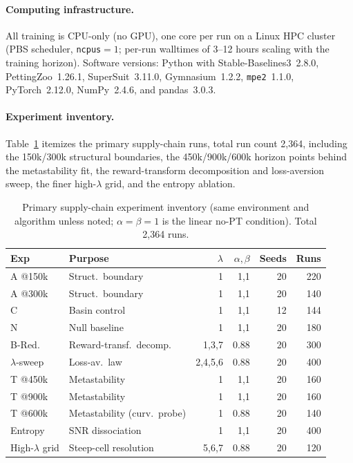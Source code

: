 \documentclass[letterpaper]{article} %
\theoremstyle{plain}
\begin{document}
\paragraph{Computing infrastructure.}
All training is CPU-only (no GPU), one core per run on a Linux HPC cluster (PBS scheduler,
\texttt{ncpus}${=}1$; per-run walltimes of 3--12 hours scaling with the training horizon).
Software versions: Python with Stable-Baselines3~2.8.0, PettingZoo~1.26.1, SuperSuit~3.11.0,
Gymnasium~1.2.2, \texttt{mpe2}~1.1.0, PyTorch~2.12.0, NumPy~2.4.6, and pandas~3.0.3.

\paragraph{Experiment inventory.}
Table~\ref{tab:experiments} itemizes the primary supply-chain runs, total run count 2{,}364,
including the 150k/300k structural boundaries, the 450k/900k/600k horizon points behind the
metastability fit, the reward-transform decomposition and loss-aversion sweep, the finer
high-$\lambda$ grid, and the entropy ablation.

\begin{table}[t]
\centering
\caption{Primary supply-chain experiment inventory (same environment and algorithm unless noted;
$\alpha{=}\beta{=}1$ is the linear no-PT condition). Total 2{,}364 runs.}
\label{tab:experiments}
\small
\setlength{\tabcolsep}{3pt}
\begin{tabular}{llrrrr}
\toprule
Exp & Purpose & $\lambda$ & $\alpha,\beta$ & Seeds & Runs \\
\midrule
A @150k & Struct.\ boundary & 1 & 1,1 & 20 & 220 \\
A @300k & Struct.\ boundary & 1 & 1,1 & 20 & 140 \\
C & Basin control & 1 & 1,1 & 12 & 144 \\
N & Null baseline & 1 & 1,1 & 20 & 180 \\
B-Red. & Reward-transf.\ decomp. & 1,3,7 & 0.88 & 20 & 300 \\
$\lambda$-sweep & Loss-av.\ law & 2,4,5,6 & 0.88 & 20 & 400 \\
T @450k & Metastability & 1 & 1,1 & 20 & 160 \\
T @900k & Metastability & 1 & 1,1 & 20 & 160 \\
T @600k & Metastability (curv.\ probe) & 1 & 0.88 & 20 & 140 \\
Entropy & SNR dissociation & 1 & 1,1 & 20 & 400 \\
High-$\lambda$ grid & Steep-cell resolution & 5,6,7 & 0.88 & 20 & 120 \\
\bottomrule
\end{tabular}
\end{table}
\end{document}
